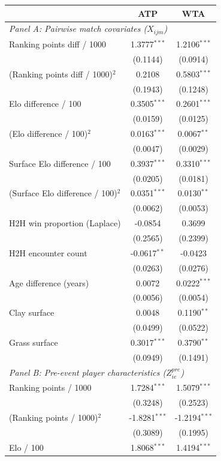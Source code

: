 \begin{tabular}{lcc}
\toprule
 & ATP & WTA \\
\midrule
\multicolumn{3}{l}{\textit{Panel A: Pairwise match covariates ($X_{ijm}$)}} \\
Ranking points diff / 1000 & 1.3777$^{***}$ & 1.2106$^{***}$ \\
 & (0.1144) & (0.0914) \\
(Ranking points diff / 1000)$^2$ & 0.2108 & 0.5803$^{***}$ \\
 & (0.1943) & (0.1248) \\
Elo difference / 100 & 0.3505$^{***}$ & 0.2601$^{***}$ \\
 & (0.0159) & (0.0125) \\
(Elo difference / 100)$^2$ & 0.0163$^{***}$ & 0.0067$^{**}$ \\
 & (0.0047) & (0.0029) \\
Surface Elo difference / 100 & 0.3937$^{***}$ & 0.3310$^{***}$ \\
 & (0.0205) & (0.0181) \\
(Surface Elo difference / 100)$^2$ & 0.0351$^{***}$ & 0.0130$^{**}$ \\
 & (0.0062) & (0.0053) \\
H2H win proportion (Laplace) & -0.0854 & 0.3699 \\
 & (0.2565) & (0.2399) \\
H2H encounter count & -0.0617$^{**}$ & -0.0423 \\
 & (0.0263) & (0.0276) \\
Age difference (years) & 0.0072 & 0.0222$^{***}$ \\
 & (0.0056) & (0.0054) \\
Clay surface & 0.0048 & 0.1190$^{**}$ \\
 & (0.0499) & (0.0522) \\
Grass surface & 0.3017$^{***}$ & 0.3790$^{**}$ \\
 & (0.0949) & (0.1491) \\
\midrule
\multicolumn{3}{l}{\textit{Panel B: Pre-event player characteristics ($Z^{pre}_{ie}$)}} \\
Ranking points / 1000 & 1.7284$^{***}$ & 1.5079$^{***}$ \\
 & (0.3248) & (0.2523) \\
(Ranking points / 1000)$^2$ & -1.8281$^{***}$ & -1.2194$^{***}$ \\
 & (0.3089) & (0.1995) \\
Elo / 100 & 1.8068$^{***}$ & 1.4194$^{***}$ \\

\end{tabular}

